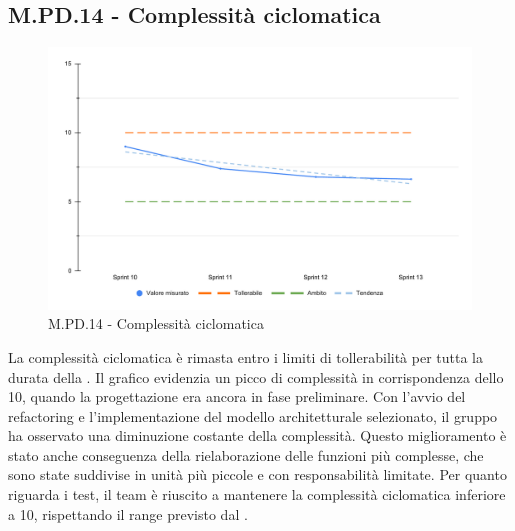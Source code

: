 \subsection{M.PD.14 - Complessità ciclomatica}

\begin{figure}[H]
  \centering
  \includegraphics[width=\textwidth]{assets/complessita_ciclomatica.pdf}
  \caption{M.PD.14 - Complessità ciclomatica}
\end{figure}

\par La complessità ciclomatica è rimasta entro i limiti di tollerabilità per tutta la durata della . Il grafico evidenzia un picco di complessità in corrispondenza dello  10, quando la progettazione era ancora in fase preliminare. Con l'avvio del refactoring e l'implementazione del modello architetturale selezionato, il gruppo ha osservato una diminuzione costante della complessità. Questo miglioramento è stato anche conseguenza della rielaborazione delle funzioni più complesse, che sono state suddivise in unità più piccole e con responsabilità limitate. Per quanto riguarda i test, il team è riuscito a mantenere la complessità ciclomatica inferiore a 10, rispettando il range previsto dal \PdQ.